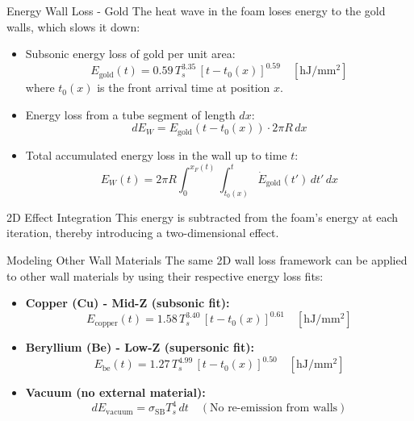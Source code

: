 \documentclass[xcolor=table]{beamer}
\begin{document}
\begin{frame}{Energy Wall Loss - Gold}
    The heat wave in the foam loses energy to the gold walls, which slows it down:
    \begin{itemize}
        \item Subsonic energy loss of gold per unit area:
        \begin{equation*}
            E_{\mathrm{gold}}(t) = 0.59\, T_s^{3.35}\, [t - t_0(x)]^{0.59} \quad [\mathrm{hJ/mm^2}]
        \end{equation*}
        where $t_0(x)$ is the front arrival time at position $x$.
        \item Energy loss from a tube segment of length $dx$:
        \begin{equation*}
            dE_W = E_{\mathrm{gold}}(t - t_0(x)) \cdot 2\pi R \, dx
        \end{equation*}
        \item Total accumulated energy loss in the wall up to time $t$:
        \begin{equation*}
            E_W(t) = 2\pi R \int_0^{x_F(t)} \int_{t_0(x)}^t \dot{E}_{\mathrm{gold}}(t') \, dt' \, dx
        \end{equation*}
    \end{itemize}
    
    \begin{alertblock}{2D Effect Integration}
        This energy is subtracted from the foam's energy at each iteration, thereby introducing a two-dimensional effect.
    \end{alertblock}
\end{frame}

\begin{frame}{Modeling Other Wall Materials}
    The same 2D wall loss framework can be applied to other wall materials by using their respective energy loss fits:
    \begin{itemize}
        \item \textbf{Copper (Cu) - Mid-Z (subsonic fit): }
        \begin{equation*}
            E_{\mathrm{copper}}(t) = 1.58\, T_s^{3.40}\, [t - t_0(x)]^{0.61} \quad [\mathrm{hJ/mm^2}]
        \end{equation*}
        \item \textbf{Beryllium (Be) - Low-Z (supersonic fit):}
        \begin{equation*}
            E_{\mathrm{be}}(t) = 1.27\, T_s^{4.99}\, [t - t_0(x)]^{0.50} \quad [\mathrm{hJ/mm^2}]
        \end{equation*}
        \item \textbf{Vacuum (no external material):}
        \begin{equation*}
            dE_{\mathrm{vacuum}} = \sigma_{\mathrm{SB}} T_s^4 \, dt \quad (\text{No re-emission from walls})
        \end{equation*}
    \end{itemize}
\end{frame}
\end{document}
